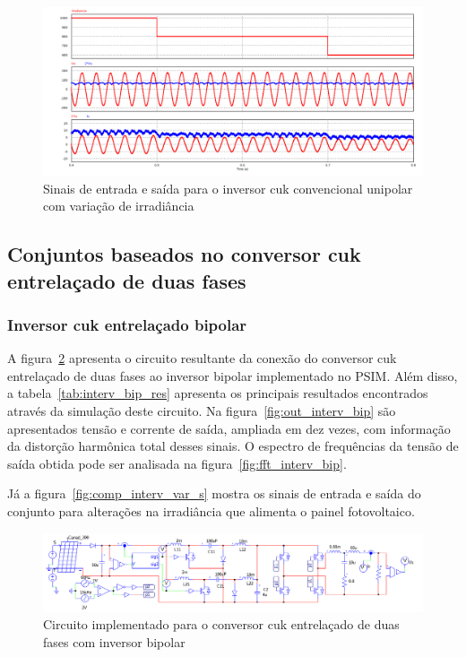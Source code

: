 \documentclass[
	12pt,				%
	openany,
	onseside,
	a4paper,			%
	english,			%
	french,				%
	spanish,			%
	brazil,				%
	]{abntex2}
\begin{document}
\begin{figure}[H]%
	\captionsetup{justification=centering}
	\centering
		\includegraphics[width= \linewidth]{comp_conv_var_s_unip}
		\caption{Sinais de entrada e saída para o inversor cuk convencional unipolar com variação de irradiância}
		\label{fig:comp_conv_var_s_unip}
\end{figure}

\subsection{Conjuntos baseados no conversor cuk entrelaçado de duas fases}

\subsubsection{Inversor cuk entrelaçado bipolar}

A figura~\ref{fig:comp_interv_circ_clean} apresenta o circuito resultante da conexão do conversor cuk entrelaçado de duas fases ao inversor bipolar implementado no PSIM. Além disso, a tabela~\ref{tab:interv_bip_res} apresenta os principais resultados encontrados através da simulação deste circuito. Na figura~\ref{fig:out_interv_bip} são apresentados tensão e corrente de saída, ampliada em dez vezes, com informação da distorção harmônica total desses sinais. O espectro de frequências da tensão de saída obtida pode ser analisada na figura~\ref{fig:fft_interv_bip}.

Já a figura~\ref{fig:comp_interv_var_s} mostra os sinais de entrada e saída do conjunto para alterações na irradiância que alimenta o painel fotovoltaico.

\begin{figure}[H]%
	\captionsetup{justification=centering}
	\centering
		\includegraphics[width= \linewidth]{comp_interv_circ_clean}
		\caption{Circuito implementado para o conversor cuk entrelaçado de duas fases com inversor bipolar}
		\label{fig:comp_interv_circ_clean}
\end{figure}
\end{document}

